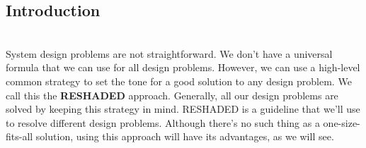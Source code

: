 

\subsection{Introduction}\label{7ilLZE_ifixwT8HQMBdOU}
\\
System design problems are not straightforward. We don't have a universal formula that we can use for all design problems. However, we can use a high-level common strategy to set the tone for a good solution to any design problem. We call this the \textbf{RESHADED} approach. Generally, all our design problems are solved by keeping this strategy in mind. RESHADED is a guideline that we'll use to resolve different design problems. Although there's no such thing as a one-size-fits-all solution, using this approach will have its advantages, as we will see.

\begin{center}
\end{center}

